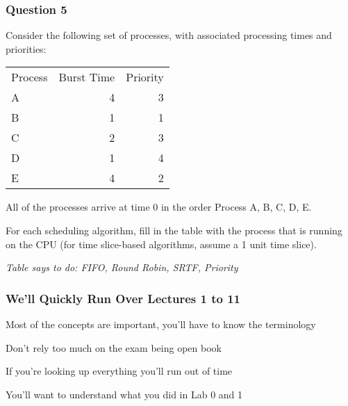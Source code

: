   \begin{frame}
    \frametitle{Question 5}

    Consider the following set of processes, with associated processing times
    and priorities:

    \begin{center}
      \footnotesize
      \begin{tabular}{lrr}
        Process & Burst Time & Priority \\
        A & 4 & 3 \\
        B & 1 & 1 \\
        C & 2 & 3 \\
        D & 1 & 4 \\
        E & 4 & 2 \\
      \end{tabular}
    \end{center}

    All of the processes arrive at time 0 in the order Process A, B, C, D, E.

    \vspace{1em}

    For each scheduling algorithm, fill in the table with the process that is
    running on the CPU (for time slice-based algorithms, assume a 1 unit time
    slice).

    \vspace{1em}

    \textit{Table says to do: FIFO, Round Robin, SRTF, Priority}
  \end{frame}

  \begin{frame}
    \frametitle{We'll Quickly Run Over Lectures 1 to 11}

    Most of the concepts are important, you'll have to know the terminology

    \vspace{2em}

    Don't rely too much on the exam being open book

    \hspace{2em} If you're looking up everything you'll run out of time

    \vspace{2em}

    You'll want to understand what you did in Lab 0 and 1
  \end{frame}


